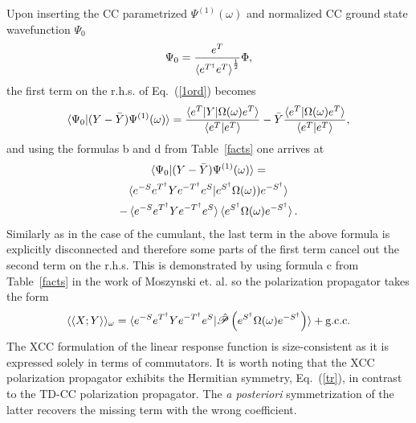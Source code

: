 \documentclass[preprint,12pt]{elsarticle}
\newcommand{\equl}[2]{\begin{equation}\label{#2} #1 \end{equation}}
\newcommand{\equml}[2]{\begin{multline}\label{#2} #1 \end{multline}}
\newcommand{\fr}[1]{Eq.~(\ref{#1})}
\newcommand{\Frt}[1]{Table~\ref{#1}}
\newcommand{\etd}{e^{T^\dagger}}
\newcommand{\esd}{e^{S^\dagger}}
\newcommand{\esdm}{e^{-S^\dagger}}
\newcommand{\etdm}{e^{-T^\dagger}}
\newcommand{\esm}{e^{-S}}
\newcommand{\es}{e^{S}}
\newcommand{\et}{e^{T}}
\newcommand{\Omm}{\Omega(\omega)}
\begin{document}
Upon inserting the CC parametrized $\Psi^{(1)}(\omega)$  and
normalized CC ground state wavefunction $\Psi_0$\cite{moszynski2005time} 
  \equl{\Psi_0 = \frac{\et}{\braket{\etd\et}^{\frac12}}\Phi, }{e2}
the first term on the r.h.s. of \fr{1ord} becomes
\equl{\braket{\Psi_0|(Y-\bar{Y})\Psi^{(1)}(\omega)} =
  \frac{\braket{\et|Y|\Omega(\omega)\et}}{\braket{\et|\et}}
- \bar{Y}\frac{\braket{\et|\Omega(\omega)\et}}{\braket{\et|\et}},
  }{p2}
and using the formulas b and d from \Frt{facts} one arrives at
\equml{\braket{\Psi_0|(Y-\bar{Y})\Psi^{(1)}(\omega)} = \\
  \braket{\esm\etd Y \etdm\es|\esd\Omm)\esdm}\\
  - \braket{\esm\etd Y\etdm\es}\braket{\esd\Omm\esdm}.}{p3}
Similarly as in the case of the cumulant, the last term in the above formula  is explicitly 
disconnected and therefore some parts of the first term  cancel
out the second term on the r.h.s. This is demonstrated by using formula c from \Frt{facts} in the work of Moszynski et. al.\cite{moszynski2005time}
so the polarization propagator takes the form
\equl{
  \langle\langle X;Y \rangle \rangle_\omega =
  \braket{e^{-S}e^{T^\dagger}Ye^{-T^\dagger}e^{S}|\hat{\mathscr{P}}\left(e^{S^\dagger}\Omm e^{-S^\dagger}\right)} + \text{g.c.c.}
}{lin}
The XCC formulation of the linear response function is size-consistent as it is expressed solely in terms
of commutators. It is worth noting that the XCC polarization propagator exhibits the Hermitian symmetry, \fr{tr},
in contrast to the TD-CC polarization propagator. The \textit{a posteriori}
symmetrization\cite{christiansen1998integral, pedersen1997coupled}  of the latter recovers the missing term with
the wrong coefficient.\cite{moszynski2005time, korona2006time} 
\end{document}

